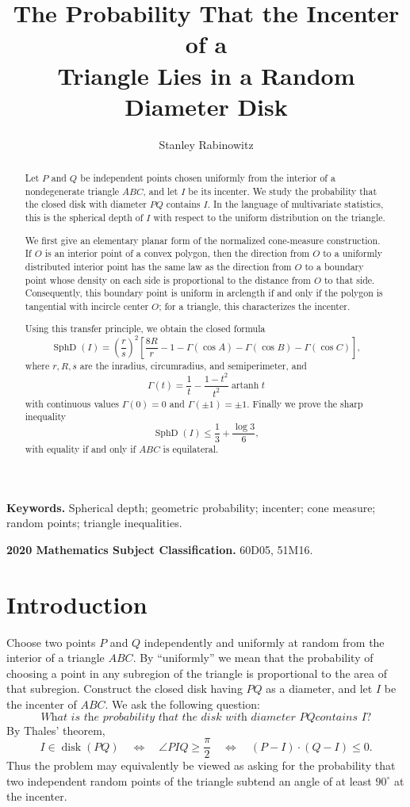 \documentclass[11pt]{article}
\title{The Probability That the Incenter of a\\Triangle Lies in a Random Diameter Disk}
\author{Stanley Rabinowitz}
\date{}
\theoremstyle{definition}
\theoremstyle{remark}
\newcommand{\SphD}{\operatorname{SphD}}
\newcommand{\artanh}{\operatorname{artanh}}
\begin{document}
\maketitle

\begin{abstract}
Let $P$ and $Q$ be independent points chosen uniformly from the interior of a nondegenerate triangle $ABC$, and let $I$ be its incenter.  We study the probability that the closed disk with diameter $PQ$ contains $I$.  In the language of multivariate statistics, this is the spherical depth of $I$ with respect to the uniform distribution on the triangle.

We first give an elementary planar form of the normalized cone-measure construction.  If $O$ is an interior point of a convex polygon, then the direction from $O$ to a uniformly distributed interior point has the same law as the direction from $O$ to a boundary point whose density on each side is proportional to the distance from $O$ to that side.  Consequently, this boundary point is uniform in arclength if and only if the polygon is tangential with incircle center $O$; for a triangle, this characterizes the incenter.

Using this transfer principle, we obtain the closed formula
\[
\SphD(I)
=\left(\frac r s\right)^2
\left[
\frac{8R}{r}-1
-\Gamma(\cos A)-\Gamma(\cos B)-\Gamma(\cos C)
\right],
\]
where $r,R,s$ are the inradius, circumradius, and semiperimeter, and
\[
\Gamma(t)=\frac1t-\frac{1-t^2}{t^2}\artanh t
\]
with continuous values $\Gamma(0)=0$ and $\Gamma(\pm1)=\pm1$.  Finally we prove the sharp inequality
\[
\SphD(I)\le \frac13+\frac{\log 3}{6},
\]
with equality if and only if $ABC$ is equilateral.
\end{abstract}

\medskip
\noindent\textbf{Keywords.} Spherical depth; geometric probability; incenter; cone measure; random points; triangle inequalities.

\noindent\textbf{2020 Mathematics Subject Classification.} 60D05, 51M16.

\section{Introduction}

Choose two points $P$ and $Q$ independently and uniformly at random
from the interior of a triangle $ABC$.  By ``uniformly'' we mean that
the probability of choosing a point in any subregion of the triangle is
proportional to the area of that subregion.  Construct the closed disk
having $PQ$ as a diameter, and let $I$ be the incenter of $ABC$.  We ask
the following question:
\[
\textit{What is the probability that the disk with diameter $PQ$
contains $I$?}
\]
By Thales' theorem,
\[
 I\in\operatorname{disk}(PQ)
 \quad\Longleftrightarrow\quad
 \angle PIQ\geq\frac{\pi}{2}
 \quad\Longleftrightarrow\quad
 (P-I)\cdot(Q-I)\leq0.
\]
Thus the problem may equivalently be viewed as asking for the
probability that two independent random points of the triangle subtend
an angle of at least $90^\circ$ at the incenter.
\end{document}
